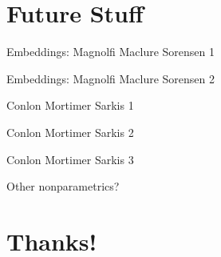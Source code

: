 \section{Future Stuff}
\begin{frame}{Embeddings: Magnolfi Maclure Sorensen 1}
\end{frame}

\begin{frame}{Embeddings: Magnolfi Maclure Sorensen 2}
\end{frame}



\begin{frame}{Conlon Mortimer Sarkis 1}
\end{frame}

\begin{frame}{Conlon Mortimer Sarkis 2}
\end{frame}

\begin{frame}{Conlon Mortimer Sarkis 3}
\end{frame}

\begin{frame}{Other nonparametrics?}
\end{frame}

\section{Thanks!}

